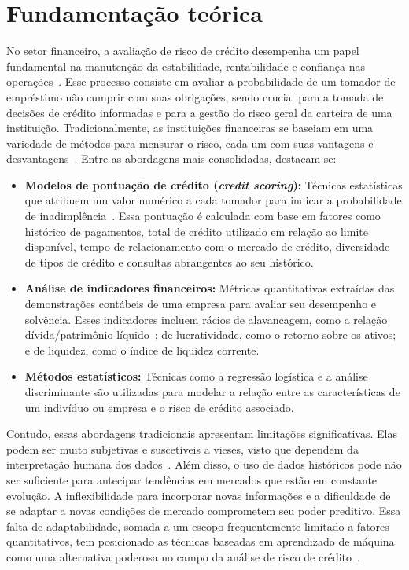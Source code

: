 \chapter{Fundamentação teórica}\label{cap:fundamentacao-teorica}

No setor financeiro, a avaliação de risco de crédito desempenha um papel fundamental na manutenção da estabilidade, rentabilidade e confiança nas operações~\cite{Chakraborty2020}. Esse processo consiste em avaliar a probabilidade de um tomador de empréstimo não cumprir com suas obrigações, sendo crucial para a tomada de decisões de crédito informadas e para a gestão do risco geral da carteira de uma instituição. Tradicionalmente, as instituições financeiras se baseiam em uma variedade de métodos para mensurar o risco, cada um com suas vantagens e desvantagens~\cite{Bello2023}. Entre as abordagens mais consolidadas, destacam-se:

\begin{itemize}
  \item \textbf{Modelos de pontuação de crédito (\textit{credit scoring}):} Técnicas estatísticas que atribuem um valor numérico a cada tomador para indicar a probabilidade de inadimplência~\cite{Pang2021}. Essa pontuação é calculada com base em fatores como histórico de pagamentos, total de crédito utilizado em relação ao limite disponível, tempo de relacionamento com o mercado de crédito, diversidade de tipos de crédito e consultas abrangentes ao seu histórico.

  \item \textbf{Análise de indicadores financeiros:} Métricas quantitativas extraídas das demonstrações contábeis de uma empresa para avaliar seu desempenho e solvência. Esses indicadores incluem rácios de alavancagem, como a relação dívida/patrimônio líquido~\cite{Coulon2019}; de lucratividade, como o retorno sobre os ativos; e de liquidez, como o índice de liquidez corrente.

  \item \textbf{Métodos estatísticos:} Técnicas como a regressão logística e a análise discriminante são utilizadas para modelar a relação entre as características de um indivíduo ou empresa e o risco de crédito associado.
\end{itemize}

Contudo, essas abordagens tradicionais apresentam limitações significativas. Elas podem ser muito subjetivas e suscetíveis a vieses, visto que dependem da interpretação humana dos dados~\cite{Bello2023, Goel2021}. Além disso, o uso de dados históricos pode não ser suficiente para antecipar tendências em mercados que estão em constante evolução. A inflexibilidade para incorporar novas informações e a dificuldade de se adaptar a novas condições de mercado comprometem seu poder preditivo. Essa falta de adaptabilidade, somada a um escopo frequentemente limitado a fatores quantitativos, tem posicionado as técnicas baseadas em aprendizado de máquina como uma alternativa poderosa no campo da análise de risco de crédito~\cite{Mhlanga2021}.

